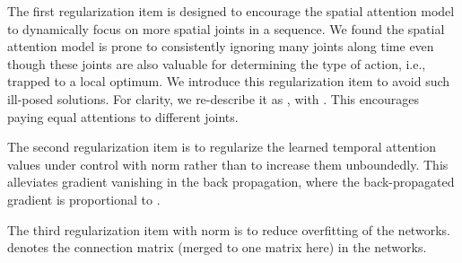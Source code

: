 \documentclass[letterpaper]{article}
\begin{document}
The first regularization item is designed to encourage the spatial attention model to dynamically focus on more spatial joints  in a sequence. We found the spatial attention model is prone to consistently ignoring many joints along time even though these joints are also valuable for determining the type of action, i.e., trapped to a local optimum. We introduce this regularization item to avoid such ill-posed solutions. For clarity, we re-describe it as , with . This encourages paying equal attentions to different joints.
\begin{comment}

\end{comment}

The second regularization item is to regularize the learned temporal attention values under control with  norm rather than to increase them unboundedly. This alleviates  gradient vanishing in the back propagation, where the back-propagated gradient is proportional to .

The third regularization item with  norm is to reduce overfitting of the networks.  denotes the connection matrix (merged to one matrix here) in the networks.
\end{document}
